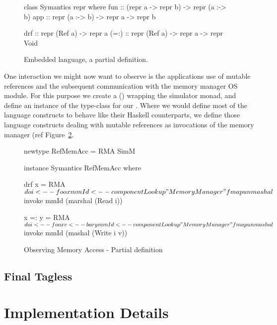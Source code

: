 \begin{figure}
\centering
\begin{code}
class Symantics repr where
  fun   :: (repr a -> repr b) -> repr (a :-> b)
  app   :: repr (a :-> b) -> repr a -> repr b

  drf   :: repr (Ref a) -> repr a
  (=:)  :: repr (Ref a) -> repr a -> repr Void
\end{code}
\caption{Embedded language, a partial definition.}
\label{fig:embedded_language_interface}
\end{figure}

One interaction we might now want to observe is the applications use of mutable references and the subsequent communication with the memory manager OS module.
For this purpose we create a  () wrapping the simulator monad, and define an instance of the  type-class for our .
Where we would define most of the language constructs to behave like their Haskell counterparts, we define those language constructs dealing with mutable references as invocations of the memory manager (ref Figure~\ref{lst_observing_memory_access}.

\begin{figure}
\centering
\begin{code}
newtype RefMemAcc = RMA SimM

instance Symantics RefMemAcc where

  drf x = RMA $ do
    i     <-- foo x
    mmId  <-- componentLookup "MemoryManager"
    fmap unmashal $ invoke mmId (marshal (Read i))

  x =: y = RMA $ do
    i     <-- foo x
    v     <-- bar y
    mmId  <-- componentLookup "MemoryManager"
    fmap unmashal $ invoke mmId (mashal (Write i v))
\end{code}
\caption{Observing Memory Access - Partial definition}
\label{lst_observing_memory_access}
\end{figure}

\subsection{Final Tagless}


\section{Implementation Details}
\label{sec:impl-detail}

